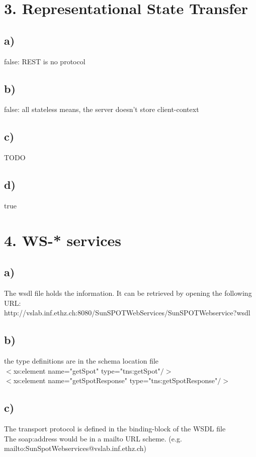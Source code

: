 \documentclass[10pt,a4paper]{article}
\begin{document}
		
	\section*{3. Representational State Transfer}
		\subsection*{a)}
			false: REST is no protocol
		\subsection*{b)}
			false: all stateless means, the server doesn't store client-context
		\subsection*{c)}
			TODO
		\subsection*{d)}
			true
		
	
	\section*{4. WS-* services}
		\subsection*{a)}
			The wsdl file holds the information. It can be retrieved by opening the following URL: \\
			http://vslab.inf.ethz.ch:8080/SunSPOTWebServices/SunSPOTWebservice?wsdl \\
			
			
		\subsection*{b)}
			the type definitions are in the schema location file \\
			$<$xs:element name="getSpot" type="tns:getSpot"$/>$ \\
			$<$xs:element name="getSpotResponse" type="tns:getSpotResponse"$/>$\\
			
		\subsection*{c)}
			The transport protocol is defined in the binding-block of the WSDL file \\
			The soap:address would be in a mailto URL scheme. (e.g. mailto:SunSpotWebservices@vslab.inf.ethz.ch)\\
			
\end{document}
